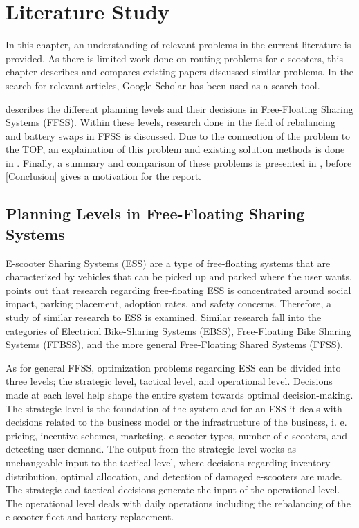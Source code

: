 \chapter{Literature Study}\label{lit_study}
In this chapter, an understanding of relevant problems in the current literature is provided. As there is limited work done on routing problems for e-scooters, this chapter describes and compares existing papers discussed similar problems. In the search for relevant articles, Google Scholar has been used as a search tool.

 describes the different planning levels and their decisions in Free-Floating Sharing Systems (FFSS). Within these levels, research done in the field of rebalancing and battery swaps in FFSS is discussed. Due to the connection of the problem to the TOP, an explaination of this problem and existing solution methods is done in . Finally, a summary and comparison of these problems is presented in , before \cref{Conclusion} gives a motivation for the report.


\section{Planning Levels in Free-Floating Sharing Systems}\label{PlanningLevels}

E-scooter Sharing Systems (ESS) are a type of free-floating systems that are characterized by vehicles that can be picked up and parked where the user wants. \citet{mckenzie_spatiotemporal_2019} points out that research regarding free-floating ESS is concentrated around social impact, parking placement, adoption rates, and safety concerns. Therefore, a study of similar research to ESS is examined. Similar research fall into the categories of Electrical Bike-Sharing Systems (EBSS), Free-Floating Bike Sharing Systems (FFBSS), and the more general Free-Floating Shared Systems (FFSS).  

As for general FFSS, optimization problems regarding ESS can be divided into three levels; the strategic level, tactical level, and operational level. Decisions made at each level help shape the entire system towards optimal decision-making. The strategic level is the foundation of the system and for an ESS it deals with decisions related to the business model or the infrastructure of the business, i. e. pricing, incentive schemes, marketing, e-scooter types, number of e-scooters, and detecting user demand. The output from the strategic level works as unchangeable input to the tactical level, where decisions regarding inventory distribution, optimal allocation, and detection of damaged e-scooters are made. The strategic and tactical decisions generate the input of the operational level. The operational level deals with daily operations including the rebalancing of the e-scooter fleet and battery replacement. 

